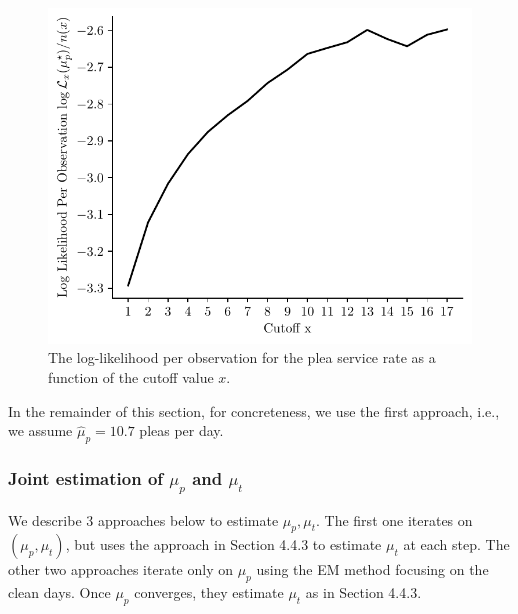 \documentclass[11pt, oneside]{article}   	%
\theoremstyle{ModifiedStyle}
\begin{document}
			\begin{figure}[H]
				\centering
				\includegraphics[scale=0.75]{Figures/Log_Likelihood_Per_Observation_Top}
				\caption{The log-likelihood per observation for the plea service rate as a function of the cutoff value $x$.}
				\vspace{-2mm}
				\label{Figure_Plea_Service_Rate_Log_Likelihood_Per_Observation}
			\end{figure}
			In the remainder of this section, for concreteness, we use the first approach, i.e., we assume $\hat{\mu}_p = 10.7$ pleas per day.

		\subsubsection{Joint estimation of $\mu_p$ and $\mu_t$}
			We describe 3 approaches below to estimate $\mu_p, \mu_t$. The first one iterates on $(\mu_p, \mu_t)$, but uses the approach in Section 4.4.3 to estimate $\mu_t$ at each step. The other two approaches iterate only on $\mu_p$ using the EM method focusing on the clean days. Once $\mu_p$ converges, they estimate $\mu_t$ as in Section 4.4.3.
\end{document}
